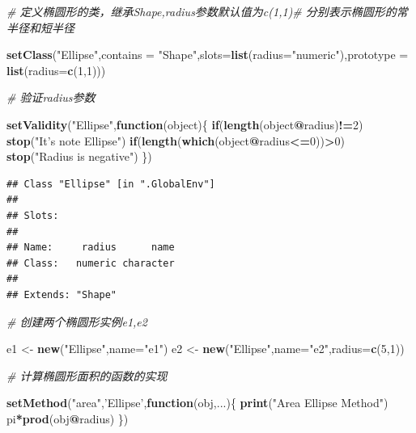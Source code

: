 \documentclass[]{book}
\newenvironment{Shaded}{\begin{snugshade}}{\end{snugshade}}
\newcommand{\KeywordTok}[1]{\textcolor[rgb]{0.13,0.29,0.53}{\textbf{#1}}}
\newcommand{\DataTypeTok}[1]{\textcolor[rgb]{0.13,0.29,0.53}{#1}}
\newcommand{\DecValTok}[1]{\textcolor[rgb]{0.00,0.00,0.81}{#1}}
\newcommand{\StringTok}[1]{\textcolor[rgb]{0.31,0.60,0.02}{#1}}
\newcommand{\CommentTok}[1]{\textcolor[rgb]{0.56,0.35,0.01}{\textit{#1}}}
\newcommand{\ControlFlowTok}[1]{\textcolor[rgb]{0.13,0.29,0.53}{\textbf{#1}}}
\newcommand{\OperatorTok}[1]{\textcolor[rgb]{0.81,0.36,0.00}{\textbf{#1}}}
\newcommand{\NormalTok}[1]{#1}
\begin{document}
\begin{Shaded}
\begin{Highlighting}[]
\CommentTok{# 定义椭圆形的类，继承Shape,radius参数默认值为c(1,1)# 分别表示椭圆形的常半径和短半径}

\KeywordTok{setClass}\NormalTok{(}\StringTok{"Ellipse"}\NormalTok{,}\DataTypeTok{contains =} \StringTok{"Shape"}\NormalTok{,}\DataTypeTok{slots=}\KeywordTok{list}\NormalTok{(}\DataTypeTok{radius=}\StringTok{"numeric"}\NormalTok{),}\DataTypeTok{prototype =} \KeywordTok{list}\NormalTok{(}\DataTypeTok{radius=}\KeywordTok{c}\NormalTok{(}\DecValTok{1}\NormalTok{,}\DecValTok{1}\NormalTok{)))}

\CommentTok{# 验证radius参数}

\KeywordTok{setValidity}\NormalTok{(}\StringTok{"Ellipse"}\NormalTok{,}\ControlFlowTok{function}\NormalTok{(object)\{}
  \ControlFlowTok{if}\NormalTok{(}\KeywordTok{length}\NormalTok{(object}\OperatorTok{@}\NormalTok{radius)}\OperatorTok{!=}\DecValTok{2}\NormalTok{) }\KeywordTok{stop}\NormalTok{(}\StringTok{"It's note Ellipse"}\NormalTok{)}
  \ControlFlowTok{if}\NormalTok{(}\KeywordTok{length}\NormalTok{(}\KeywordTok{which}\NormalTok{(object}\OperatorTok{@}\NormalTok{radius}\OperatorTok{<=}\DecValTok{0}\NormalTok{))}\OperatorTok{>}\DecValTok{0}\NormalTok{) }\KeywordTok{stop}\NormalTok{(}\StringTok{"Radius is negative"}\NormalTok{)}
\NormalTok{\})}
\end{Highlighting}
\end{Shaded}

\begin{verbatim}
## Class "Ellipse" [in ".GlobalEnv"]
## 
## Slots:
##                           
## Name:     radius      name
## Class:   numeric character
## 
## Extends: "Shape"
\end{verbatim}

\begin{Shaded}
\begin{Highlighting}[]
\CommentTok{# 创建两个椭圆形实例e1,e2}

\NormalTok{e1 <-}\StringTok{ }\KeywordTok{new}\NormalTok{(}\StringTok{"Ellipse"}\NormalTok{,}\DataTypeTok{name=}\StringTok{"e1"}\NormalTok{)}
\NormalTok{e2 <-}\StringTok{ }\KeywordTok{new}\NormalTok{(}\StringTok{"Ellipse"}\NormalTok{,}\DataTypeTok{name=}\StringTok{"e2"}\NormalTok{,}\DataTypeTok{radius=}\KeywordTok{c}\NormalTok{(}\DecValTok{5}\NormalTok{,}\DecValTok{1}\NormalTok{))}

\CommentTok{# 计算椭圆形面积的函数的实现}

\KeywordTok{setMethod}\NormalTok{(}\StringTok{"area"}\NormalTok{,}\StringTok{'Ellipse'}\NormalTok{,}\ControlFlowTok{function}\NormalTok{(obj,...)\{}
  \KeywordTok{print}\NormalTok{(}\StringTok{"Area Ellipse Method"}\NormalTok{)}
\NormalTok{  pi}\OperatorTok{*}\KeywordTok{prod}\NormalTok{(obj}\OperatorTok{@}\NormalTok{radius)}
\NormalTok{\})}
\end{Highlighting}
\end{Shaded}
\end{document}
